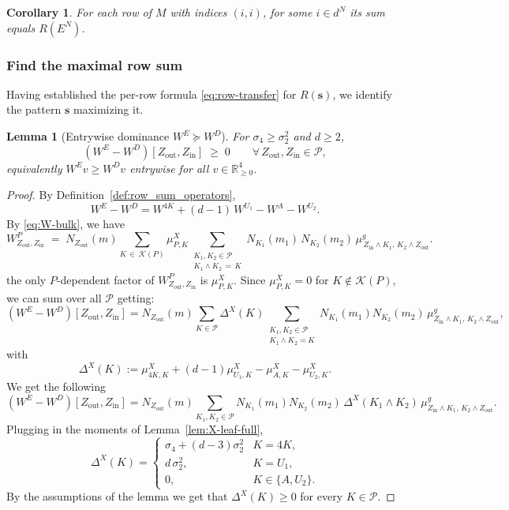 \documentclass[12pt,a4paper]{article}
\newtheorem{lemma}[theorem]{Lemma}
\newtheorem{corollary}[theorem]{Corollary}
\newcommand{\R}{\mathbb{R}}
\begin{document}
\begin{corollary}\label{cor:EN-rowsum}
For each row of $M$ with indices $(i,i)$, for some $i\in d^N$ its sum equals $R(E^N)$.
\end{corollary}

\subsubsection{Find the maximal row sum}
Having established the per-row formula \eqref{eq:row-transfer} for $R(\mathbf{s})$, we identify the pattern $\mathbf{s}$ maximizing it.

\begin{lemma}[Entrywise dominance $W^E \succeq W^D$]\label{lem:transition_matrix_dominance}
For $\sigma_4 \geq \sigma_2^2$ and $d\geq 2$,
\begin{equation}
(W^E - W^D)[Z_\mathrm{out},Z_\mathrm{in}] \;\geq\; 0 \qquad \forall\,Z_\mathrm{out},Z_\mathrm{in}\in\mathcal{P},
\end{equation}
equivalently $W^E v \geq W^D v$ entrywise for all $v\in\R^4_{\geq 0}$.
\end{lemma}
\begin{proof}
By Definition~\ref{def:row_sum_operators},
\[
W^E - W^D = W^{4K} + (d-1)\,W^{U_1} - W^{A} - W^{U_2}.
\]
By \eqref{eq:W-bulk}, we have \begin{equation}\label{eq:W-bulk}
W^{P}_{Z_{\mathrm{out}}, Z_{\mathrm{in}}}
\;=\;
N_{Z_{\mathrm{out}}}(m)
\!\!\sum_{K \,\in\, \mathcal{K}(P)}\!\! \mu^{X}_{P, K}
\!\!\!\!\sum_{\substack{K_{1}, K_{2} \in \mathcal{P} \\ K_{1} \wedge K_{2} \,=\, K}}\!\!\!\!
N_{K_{1}}(m_{1})\, N_{K_{2}}(m_{2})\,
\mu^{g}_{\,Z_{\mathrm{in}} \wedge K_{1},\, K_{2} \wedge Z_{\mathrm{out}}}.
\end{equation}
the only $P$-dependent factor of $W^{P}_{Z_\mathrm{out},Z_\mathrm{in}}$ is $\mu^X_{P,K}$. 
Since $\mu^X_{P,K}=0$ for $K\notin\mathcal{K}(P)$, we can sum over all $\mathcal{P}$ getting:
\[
(W^E - W^D)[Z_\mathrm{out},Z_\mathrm{in}]
= N_{Z_\mathrm{out}}(m)\!\!\sum_{K\in\mathcal{P}}\Delta^X(K)\!\!\!\sum_{\substack{K_1,K_2\in\mathcal{P}\\K_1\wedge K_2=K}}\!\!\!N_{K_1}(m_1)N_{K_2}(m_2)\,\mu^g_{Z_\mathrm{in}\wedge K_1,\,K_2\wedge Z_\mathrm{out}},
\]
with
\[
\Delta^X(K):=\mu^X_{4K,K}+(d-1)\mu^X_{U_1,K}-\mu^X_{A,K}-\mu^X_{U_2,K}.
\]
We get the following
\begin{equation}\label{eq:T-diff}
(W^E - W^D)[Z_\mathrm{out},Z_\mathrm{in}]
= N_{Z_\mathrm{out}}(m)\!\!\sum_{K_1,K_2\in\mathcal{P}}\!\! N_{K_1}(m_1)N_{K_2}(m_2)\,\Delta^X(K_1\wedge K_2)\,\mu^g_{Z_\mathrm{in}\wedge K_1,\,K_2\wedge Z_\mathrm{out}}.
\end{equation}
Plugging in the moments of Lemma~\ref{lem:X-leaf-full},
\[
\Delta^X(K)=
\begin{cases}
\sigma_4 + (d-3)\sigma_2^2  & K=4K,\\[2pt]
d\,\sigma_2^2, & K=U_1,\\[2pt]
0, & K\in\{A,U_2\}.
\end{cases}
\]
By the assumptions of the lemma we get that $\Delta^X(K)\ge0$ for every $K\in \mathcal{P}$.
\end{proof}
\end{document}
